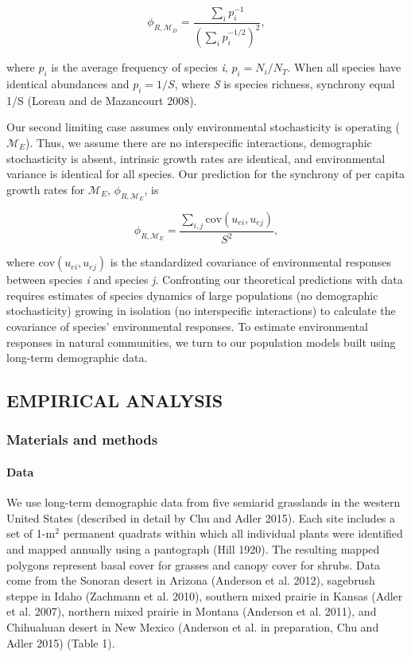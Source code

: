 \documentclass[12pt,]{article}
\begin{document}
\begin{equation}
\phi_{R,\mathcal{M}_{D}} = \frac{\sum_i p_i^{-1}}{\left(\sum_i p_i^{-1/2} \right)^2},
\end{equation}

\noindent where \(p_i\) is the average frequency of species \emph{i},
\(p_i = N_i/N_T\). When all species have identical abundances and
\(p_i = 1/S\), where \emph{S} is species richness, synchrony equal 1/S
(Loreau and {{de Mazancourt}} 2008).

Our second limiting case assumes only environmental stochasticity is
operating (\(\mathcal{M}_{E}\)). Thus, we assume there are no
interspecific interactions, demographic stochasticity is absent,
intrinsic growth rates are identical, and environmental variance is
identical for all species. Our prediction for the synchrony of per
capita growth rates for \(\mathcal{M}_{E}\),
\(\phi_{R,\mathcal{M}_{E}}\), is

\begin{equation}
\phi_{R,\mathcal{M}_{E}} = \frac{\sum_{i,j}\text{cov}(u_{ei},u_{ej})}{S^2},
\end{equation}

\noindent{} where \(\text{cov}(u_{ei},u_{ej})\) is the standardized
covariance of environmental responses between species \emph{i} and
species \emph{j}. Confronting our theoretical predictions with data
requires estimates of species dynamics of large populations (no
demographic stochasticity) growing in isolation (no interspecific
interactions) to calculate the covariance of species' environmental
responses. To estimate environmental responses in natural communities,
we turn to our population models built using long-term demographic data.

\subsection{EMPIRICAL ANALYSIS}\label{empirical-analysis}

\subsubsection{Materials and methods}\label{materials-and-methods}

\paragraph{Data}\label{data}

We use long-term demographic data from five semiarid grasslands in the
western United States (described in detail by Chu and Adler 2015). Each
site includes a set of 1-\(\text{m}^2\) permanent quadrats within which
all individual plants were identified and mapped annually using a
pantograph (Hill 1920). The resulting mapped polygons represent basal
cover for grasses and canopy cover for shrubs. Data come from the
Sonoran desert in Arizona (Anderson et al. 2012), sagebrush steppe in
Idaho (Zachmann et al. 2010), southern mixed prairie in Kansas (Adler et
al. 2007), northern mixed prairie in Montana (Anderson et al. 2011), and
Chihuahuan desert in New Mexico (Anderson et al. in preparation, Chu and
Adler 2015) (Table 1).
\end{document}

